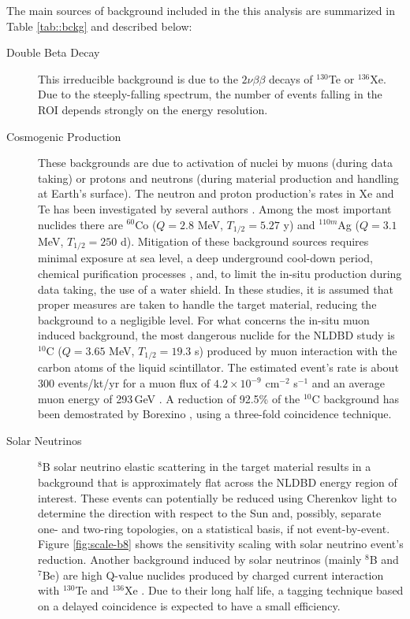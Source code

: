 The main sources of background included in the this analysis are summarized in Table \ref{tab::bckg} and described below:

\begin{description}
\item[Double Beta Decay] This irreducible background is due to the $2\nu\beta\beta$ decays of $^{130}$Te or $^{136}$Xe. Due to the steeply-falling
spectrum, the number of events falling in the ROI depends strongly on the energy resolution.
\item[Cosmogenic Production] These backgrounds are due to activation of nuclei by muons (during data taking) or protons and neutrons (during material production and handling at Earth's surface). The neutron and proton production's rates in Xe and Te has been investigated by several authors \cite{mei09, baudis15, zhang16, norm05, bard97, wang15, lozza15}. Among the most important nuclides there are $^{60}$Co ($Q=2.8$ MeV, $T_{1/2}=5.27$ y) and $^{110m}$Ag ($Q=3.1$ MeV, $T_{1/2}=250$ d). Mitigation of these background sources requires minimal exposure at sea level, a deep underground cool-down period, chemical purification processes \cite{snop16}, and, to limit the in-situ production during data taking, the use of a water shield. In these studies, it is assumed that proper measures are taken to handle the target material, reducing the background to a negligible level. For what concerns the in-situ muon induced background, the most dangerous nuclide for the NLDBD study is $^{10}$C ($Q=3.65$ MeV, $T_{1/2}=19.3$ s) produced by muon interaction with the carbon atoms of the liquid scintillator. The estimated event's rate is about 300 events/kt/yr \cite{hagn00} for a muon flux of $4.2\times10^{-9}$ cm$^{-2}$ s$^{-1}$ and an average muon energy of 293\,GeV \cite{mei06}. A reduction of 92.5\% of the $^{10}$C background has been demostrated by Borexino \cite{bxo2013}, using a three-fold coincidence technique\cite{galb05, gando16}.
\item[Solar Neutrinos] $^{8}$B solar neutrino elastic scattering in the target material results in a background that is approximately flat across the NLDBD energy region of interest. These events can potentially be reduced using Cherenkov light to determine the direction with respect to the Sun and, possibly, separate one- and two-ring topologies, on a statistical basis, if not event-by-event. Figure \ref{fig:scale-b8} shows the sensitivity scaling with solar neutrino event's reduction.
Another background induced by solar neutrinos (mainly $^{8}$B and $^{7}$Be) are high Q-value nuclides produced by charged current interaction with $^{130}$Te and $^{136}$Xe \cite{eijiri14, eijiri17}. Due to their long half life, a tagging technique based on a delayed coincidence is expected to have a small efficiency. 

\end{description}
